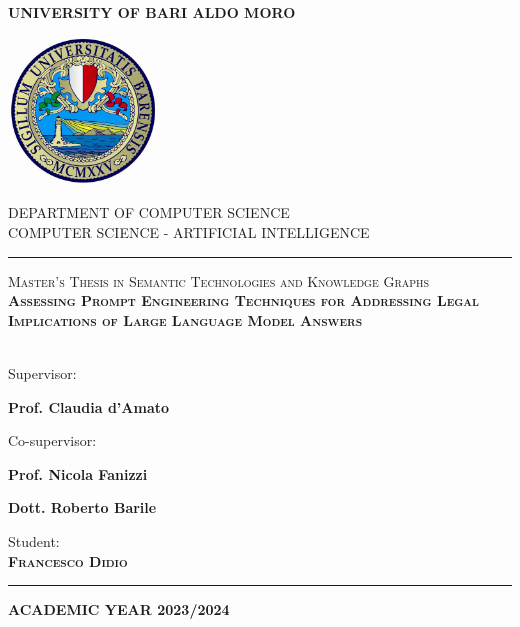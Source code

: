 

\begin{titlepage}
\begin{center}
{\LARGE \textbf{UNIVERSITY OF BARI ALDO MORO}}\\
\vspace{5mm}

\includegraphics[width=0.30\textwidth]{Figures/uniba.jpg}

\vspace{10mm}

{\LARGE DEPARTMENT OF COMPUTER SCIENCE}\\
\vspace{5mm}
{\large COMPUTER SCIENCE - ARTIFICIAL INTELLIGENCE}
\vspace{5mm}
\hrule
\vspace{10mm}
{\textsc{Master's Thesis in Semantic Technologies and Knowledge Graphs}}\\
\vspace{5mm}
{\large \scshape \textbf{Assessing Prompt Engineering Techniques for Addressing Legal Implications of Large Language Model Answers}}\\
{\large \scshape \textbf{}}\\
\end{center}

\vspace{10mm}

\noindent Supervisor:\par
\textbf{Prof. Claudia d'Amato}

\vspace{4mm}

\noindent Co-supervisor:\par
\textbf{Prof. Nicola Fanizzi}\par
\textbf{Dott. Roberto Barile}


\begin{flushright}
Student:\\
{\scshape\large \textbf{Francesco Didio}}
\end{flushright}
\hrule 
\begin{center}
{\LARGE \textbf{ACADEMIC YEAR 2023/2024}}\\
\end{center}
\end{titlepage}

\cleardoublepage